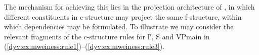 \documentclass[output=paper]{langsci/langscibook}
\begin{document}
The mechanism for achieving this lies in the projection architecture of , in which different constituents in c-structure may project the same f-structure, within which dependencies may be formulated.
To illustrate we may consider the relevant fragments of the c-structure rules for I′, S and VPmain in (\ref{dyv:ex:mweiness:rule1})–(\ref{dyv:ex:mweiness:rule3}).



\end{document}
